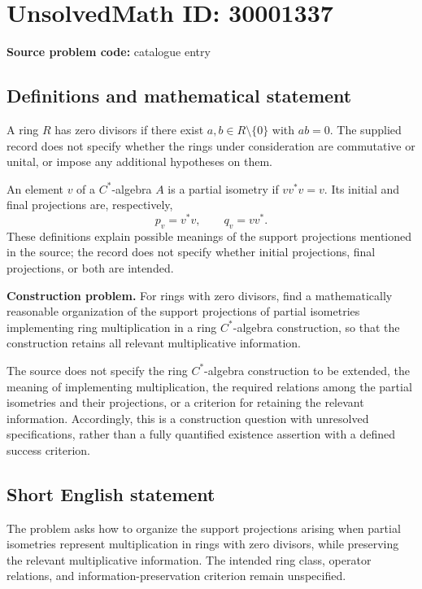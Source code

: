 \documentclass[11pt]{article}
\begin{document}
\section*{UnsolvedMath ID: 30001337}
\textbf{Source problem code:} catalogue entry
\subsection{Definitions and mathematical statement}
A ring \(R\) has zero divisors if there exist \(a,b\in R\setminus\{0\}\) with \(ab=0\). The supplied record does not specify whether the rings under consideration are commutative or unital, or impose any additional hypotheses on them.

An element \(v\) of a \(C^*\)-algebra \(A\) is a partial isometry if \(vv^*v=v\). Its initial and final projections are, respectively,
\[
 p_v=v^*v,\qquad q_v=vv^*.
\]
These definitions explain possible meanings of the support projections mentioned in the source; the record does not specify whether initial projections, final projections, or both are intended.

\textbf{Construction problem.} For rings with zero divisors, find a mathematically reasonable organization of the support projections of partial isometries implementing ring multiplication in a ring \(C^*\)-algebra construction, so that the construction retains all relevant multiplicative information.

The source does not specify the ring \(C^*\)-algebra construction to be extended, the meaning of implementing multiplication, the required relations among the partial isometries and their projections, or a criterion for retaining the relevant information. Accordingly, this is a construction question with unresolved specifications, rather than a fully quantified existence assertion with a defined success criterion.
\subsection{Short English statement}
The problem asks how to organize the support projections arising when partial isometries represent multiplication in rings with zero divisors, while preserving the relevant multiplicative information. The intended ring class, operator relations, and information-preservation criterion remain unspecified.
\end{document}
